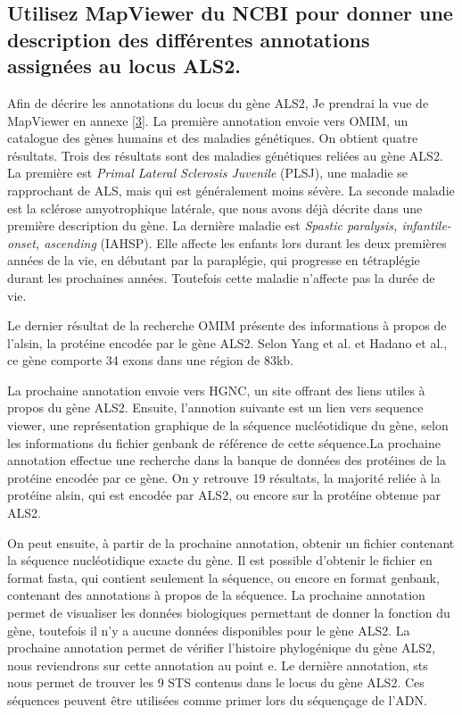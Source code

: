 \documentclass[10.8pt]{article} %
\begin{document}
\subsection[Annotations du gène ALS2]{Utilisez MapViewer du NCBI pour donner une description des différentes annotations
assignées au locus ALS2.}

Afin de décrire les annotations du locus du gène ALS2, Je prendrai la vue de MapViewer en annexe \ref{3}. La première annotation envoie
vers OMIM, un catalogue des gènes humains et des maladies génétiques. On obtient quatre résultats. Trois des résultats
sont des maladies génétiques reliées au gène ALS2. La première est \emph{Primal Lateral Sclerosis Juvenile} (PLSJ), une maladie
se rapprochant de ALS, mais qui est généralement moins sévère. La seconde maladie est la sclérose amyotrophique latérale, que nous
avons déjà décrite dans une première description du gène. La dernière maladie est \emph{Spastic paralysis, infantile-onset, ascending}
 (IAHSP). Elle affecte les enfants lors durant les deux premières années de la vie, en débutant par la paraplégie, qui progresse
en tétraplégie durant les prochaines années. Toutefois cette maladie n'affecte pas la durée de vie. 

Le dernier résultat de la recherche OMIM présente des informations à propos de l'alsin, la protéine encodée par le gène ALS2. Selon
Yang et al. et Hadano et al., ce gène comporte 34 exons dans une région de 83kb.

La prochaine annotation envoie vers HGNC, un site offrant des liens utiles à propos du gène ALS2. Ensuite, l'annotion suivante 
est un lien vers sequence viewer, une représentation graphique de la séquence nucléotidique du gène, selon les informations
du fichier genbank de référence de cette séquence.La prochaine annotation effectue une recherche dans la banque de données
des protéines de la protéine encodée par ce gène. On y retrouve 19 résultats, la majorité reliée à la protéine alsin, qui est
encodée par ALS2, ou encore sur la protéine obtenue par ALS2. 

On peut ensuite, à partir de la prochaine annotation, obtenir un fichier contenant la séquence nucléotidique exacte du gène.
Il est possible d'obtenir le fichier en format fasta, qui contient seulement la séquence, ou encore en format genbank, contenant
des annotations à propos de la séquence. La prochaine annotation permet de visualiser les données biologiques permettant
de donner la fonction du gène, toutefois il n'y a aucune données disponibles pour le gène ALS2. La prochaine annotation permet
de vérifier l'histoire phylogénique du gène ALS2, nous reviendrons sur cette annotation au point e. Le dernière annotation, sts
nous permet de trouver les 9 STS contenus dans le locus du gène ALS2. Ces séquences peuvent être utilisées comme primer lors
du séquençage de l'ADN.
\end{document}
